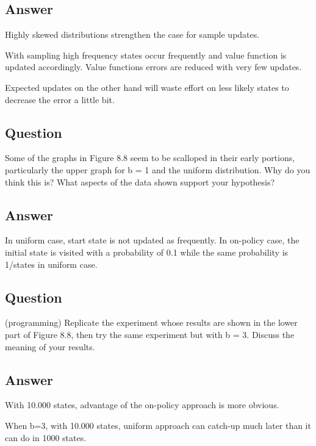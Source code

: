 \documentclass[11pt]{article}
\begin{document}
    \subsection*{Answer}

    Highly skewed distributions strengthen the case for sample updates.

    With sampling high frequency states occur frequently and value function is updated accordingly.
    Value functions errors are reduced with very few updates.

    Expected updates on the other hand will waste effort on less likely states to decrease the error a little bit.


    \subsection{Question}

    Some of the graphs in Figure 8.8 seem to be scalloped in their early portions, particularly the upper graph for b = 1 and the uniform distribution.
    Why do you think this is?
    What aspects of the data shown support your hypothesis?

    \subsection*{Answer}

    In uniform case, start state is not updated as frequently.
    In on-policy case, the initial state is visited with a probability of 0.1 while the same probability is 1/states in uniform case.

    \subsection{Question}
    (programming) Replicate the experiment whose results are shown in the lower part of Figure 8.8, then try the same experiment but with b = 3.
    Discuss the meaning of your results.

    \subsection*{Answer}

    With 10.000 states, advantage of the on-policy approach is more obvious.

    When b=3, with 10.000 states, uniform approach can catch-up much later than it can do in 1000 states.
\end{document}
